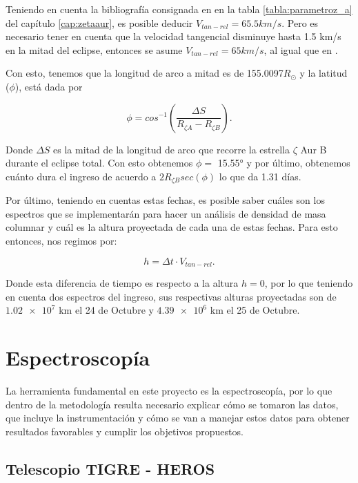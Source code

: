 \documentclass[12pt,oneside,openany,letter]{book}
\begin{document}
Teniendo en cuenta la bibliografía consignada en en la tabla \ref{tabla:parametroz_a} del capítulo \ref{cap:zetaaur}, es posible deducir $V_{tan-rel} = 65.5 km/s$. Pero es necesario tener en cuenta que la velocidad tangencial disminuye hasta 1.5 km/s en la mitad del eclipse, entonces se asume $V_{tan-rel} = 65 km/s$, al igual que en \citet{kps9}.

Con esto, tenemos que la longitud de arco a mitad es de 155.0097$ R_{\odot}$ y la latitud ($\phi$), está dada por

\begin{equation*}
    \phi = cos^{-1}\left(\frac{\Delta S}{R_{\zeta A} - R_{\zeta B}}\right).
\end{equation*}

Donde $\Delta S$ es la mitad de la longitud de arco que recorre la estrella $\zeta$ Aur B durante el eclipse total. Con esto obtenemos $\phi =$ 15.55° y por último, obtenemos cuánto dura el ingreso de acuerdo a $2R_{\zeta B} sec (\phi)$ lo que da 1.31 días.

\noindent Por último, teniendo en cuentas estas fechas, es posible saber cuáles son los espectros que se implementarán para hacer un análisis de densidad de masa columnar y cuál es la altura proyectada de cada una de estas fechas. Para esto entonces, nos regimos por:

\begin{equation*}
    h = \Delta t \cdot V_{tan-rel}.
\end{equation*}

Donde esta diferencia de tiempo es respecto a la altura $h = 0$, por lo que teniendo en cuenta dos espectros del ingreso, sus respectivas alturas proyectadas son de $\num{1.02e7}$ km el 24 de Octubre y $\num{4.39e6}$ km el 25 de Octubre.





\section{Espectroscopía} 
La herramienta fundamental en este proyecto es la espectroscopía, por lo que dentro de la metodología resulta necesario explicar cómo se tomaron las datos, que incluye la instrumentación y cómo se van a manejar estos datos para obtener resultados favorables y cumplir los objetivos propuestos.

\subsection*{Telescopio TIGRE - HEROS}
\end{document}
